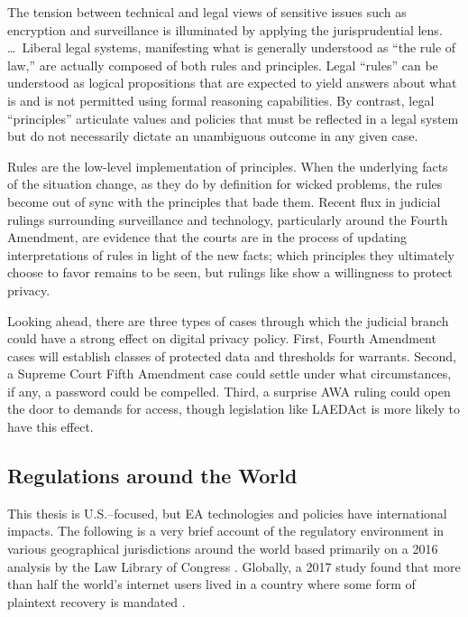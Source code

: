 \begin{displayquote}
The tension between technical and legal views of sensitive issues such as encryption and surveillance is illuminated by
applying the jurisprudential lens. \dots~Liberal legal systems, manifesting what is generally understood as ``the rule
of law,'' are actually composed of both rules and principles. Legal ``rules'' can be understood as logical propositions
that are expected to yield answers about what is and is not permitted using formal reasoning capabilities. By contrast,
legal ``principles'' articulate values and policies that must be reflected in a legal system but do not necessarily
dictate an unambiguous outcome in any given case.
\end{displayquote}

Rules are the low-level implementation of principles. When the underlying facts of the situation change, as they do by
definition for wicked problems, the rules become out of sync with the principles that bade them. Recent flux in judicial
rulings surrounding surveillance and technology, particularly around the Fourth Amendment, are evidence that the courts
are in the process of updating interpretations of rules in light of the new facts; which principles they ultimately
choose to favor remains to be seen, but rulings like  show a willingness to protect privacy.

Looking ahead, there are three types of cases through which the judicial branch could have a strong effect on digital
privacy policy. First, Fourth Amendment cases will establish classes of protected data and thresholds for warrants.
Second, a Supreme Court Fifth Amendment case could settle under what circumstances, if any, a password could be
compelled. Third, a surprise \ac{AWA} ruling could open the door to demands for access, though legislation like
\ac{LAEDAct} is more likely to have this effect.


\subsection{Regulations around the World}
\label{sec-world-regs}

This thesis is U.S.--focused, but \ac{EA} technologies and policies have international impacts. The following is a very
brief account of the regulatory environment in various geographical jurisdictions around the world based primarily on a
2016 analysis by the Law Library of Congress \cite{acosta_government_2016}. Globally, a 2017 study found that more than
half the world's internet users lived in a country where some form of plaintext recovery is mandated \cite{lewis_2017}.

